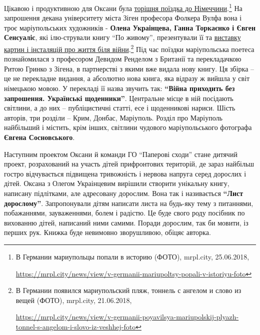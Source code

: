 

Цікавою і продуктивною для Оксани була \href{https://mrpl.city/news/view/v-germanii-mariupoltsy-popali-v-istoriyu-foto}{торішня поїздка до Німеччини}.\footnote{В Германии мариупольцы попали в историю (ФОТО), mrpl.city, 25.06.2018, \par\url{https://mrpl.city/news/view/v-germanii-mariupoltsy-popali-v-istoriyu-foto}} 
На запрошення декана університету міста Зіген професора Фолкера Вулфа вона і
троє маріупольських художників - \textbf{Олена Украінцева, Ганна Торкаєнко і
Євген Сенсуаліс}, які ілю\hyp{}стрували книгу \enquote{По живому}, презентували її та
\href{https://mrpl.city/news/view/v-germanii-poyavilsya-mariupolskij-plyazh-tonnel-s-angelom-i-slovo-iz-veshhej-foto}{виставку картин і інсталяцій про життя біля війни}.\footnote{В Германии появился мариупольский пляж, тоннель с ангелом и слово из вещей (ФОТО), mrpl.city, 21.06.2018, \par\url{https://mrpl.city/news/view/v-germanii-poyavilsya-mariupolskij-plyazh-tonnel-s-angelom-i-slovo-iz-veshhej-foto}} Під час поїздки
маріупольська поетеса познайомилася з професором Девидом Ренделом з Британії та
перекладачкою Ритою Гринко з Зігена, в партнерстві з якими вже видала нову
книгу. Ця збірка – це не перекладне видання, а абсолютно нова книга, яка
відразу ж вийшла у світ німецькою мовою. У перекладі її назва звучить так:
\textbf{\enquote{Війна приходить без запрошення. Українські щоденники}}. Центральне
місце в ній посідають світлини, а до них – публіцистичні статті, есе і
щоденникові нариси. Шість авторів, три розділи – Крим, Донбас, Маріуполь.
Розділ про Маріуполь найбільший і містить, крім інших, світлини чудового
маріупольського фотографа \textbf{Євгена Сосновського}.

Наступним проектом Оксани й команди ГО \enquote{Паперові сходи} стане дитячий проект,
розрахований на участь дітей прифронтових територій, де зараз найбільш гостро
відчувається підвищена тривожність і нервова напруга серед дорослих і дітей.
Оксана з Олегом Украінцевим вирішили створити унікальну книгу, написану
підлітками, але адресовану дорослим. Вона так і називається \textbf{\enquote{Лист дорослому}}.
Запропонували дітям написати листа на будь-яку тему з питаннями, побажаннями,
зауваженнями, болем і радістю. Це буде свого роду посібник по вихованню дітей,
написаний ними самими. Поради дорослим, так би мовити, із перших рук. Книжка
буде невимовно зворушливою, обіцяє авторка.

